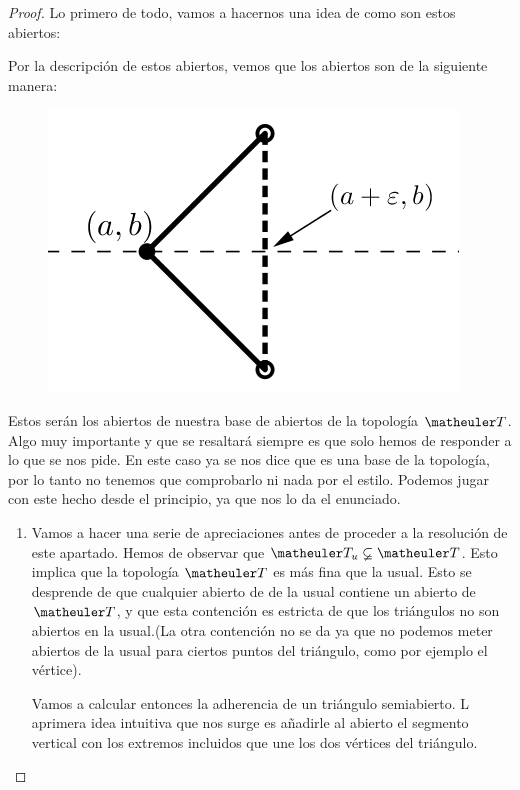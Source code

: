 \begin{proof}
	Lo primero de todo, vamos a hacernos una idea de como son estos abiertos:
	
	Por la descripción de estos abiertos, vemos que los abiertos son de la siguiente manera:
	\begin{figure}[h!]
		\centering
		\includegraphics[scale = 1.5]{img/ExamenSeptiembre2017/Abiertosimg}
	\end{figure}
	Estos serán los abiertos de nuestra base de abiertos de la topología $\T$.
	Algo muy importante y que se resaltará siempre es que solo hemos de responder a lo que se nos pide. En este caso ya se nos dice que es una base de la topología, por lo tanto no tenemos que comprobarlo ni nada por el estilo. Podemos jugar con este hecho desde el principio, ya que nos lo da el enunciado.
	\begin{enumerate}
		\item Vamos a hacer una serie de apreciaciones antes de proceder a la resolución de este apartado. Hemos de observar que $\T_u \varsubsetneq \T$. Esto implica que la topología $\T$ es más fina que la usual. Esto se desprende de que cualquier abierto de de la usual contiene un abierto de $\T$, y que esta contención es estricta de que los triángulos no son abiertos en la usual.(La otra contención no se da ya que no podemos meter abiertos de la usual para ciertos puntos del triángulo, como por ejemplo el vértice).
		
		Vamos a calcular entonces la adherencia de un triángulo semiabierto. L aprimera idea intuitiva que nos surge es añadirle al abierto el segmento vertical con los extremos incluidos que une los dos vértices del triángulo.
		

\end{enumerate}
\end{proof}
